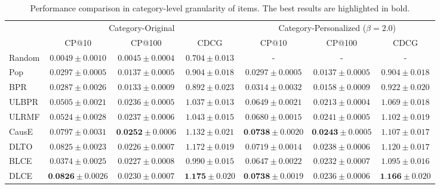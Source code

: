 \documentclass[manuscript,screen]{acmart}
\begin{document}
\begin{table}[htbp]
	\small
	\caption{Performance comparison in category-level granularity of items.
		The best results are highlighted in bold.
	}
	\label{tab:comparison_category}
	\centering
	\begin{tabular}{lcccccc}
		\toprule
		& \multicolumn{3}{c}{Category-Original} & \multicolumn{3}{c}{Category-Personalized ($\beta = 2.0$)}\\
		\cmidrule(lr){2-4} \cmidrule(lr){5-7} 
		& CP@10 & CP@100 & CDCG & CP@10 & CP@100 & CDCG \\
		\midrule
		Random & $0.0049 \pm 0.0010$ & $0.0045 \pm 0.0004$ & $0.704 \pm 0.013$ 
		&- & - & -  \\
		Pop & $0.0297 \pm 0.0005$ & $0.0137 \pm 0.0005$ & $0.904 \pm 0.018$ 
		& $0.0297 \pm 0.0005$ & $0.0137 \pm 0.0005$ & $0.904 \pm 0.018$  \\
		BPR & $0.0287 \pm 0.0026$ & $0.0133 \pm 0.0009$ & $0.892 \pm 0.023$ 
		&$0.0314 \pm 0.0032$ & $0.0158 \pm 0.0009$ & $0.922 \pm 0.020$   \\
		\midrule
		ULBPR & $0.0505 \pm 0.0021$ & $0.0236 \pm 0.0005$ & $1.037 \pm 0.013$ 
		&$0.0649 \pm 0.0021$ & $0.0213 \pm 0.0004$ & $1.069 \pm 0.018$  \\
		ULRMF & $0.0524 \pm 0.0028$ & $0.0237 \pm 0.0006$ & $1.043 \pm 0.015$ 
		&$0.0680 \pm 0.0015$ & $0.0241 \pm 0.0005$ & $1.102 \pm 0.019$  \\
		CausE & $0.0797 \pm 0.0031$ & $\textbf{0.0252} \pm 0.0006$ & $1.132 \pm 0.021$ 
		&$\textbf{0.0738} \pm 0.0020$ & $\textbf{0.0243} \pm 0.0005$ & $1.107 \pm 0.017$  \\
		DLTO &$0.0825 \pm 0.0023$ & $0.0226 \pm 0.0007$ & $1.172 \pm 0.019$ 
		&$0.0719 \pm 0.0014$ & $0.0238 \pm 0.0006$ & $1.120 \pm 0.017$  \\
		BLCE &$0.0374 \pm 0.0025$ & $0.0227 \pm 0.0008$ & $0.990 \pm 0.015$ 
		&$0.0647 \pm 0.0022$ & $0.0232 \pm 0.0007$ & $1.095 \pm 0.016$  \\
		DLCE &$\textbf{0.0826} \pm 0.0026$ & $0.0230 \pm 0.0007$ & $\textbf{1.175} \pm 0.020$ 
		&$\textbf{0.0738} \pm 0.0019$ & $0.0236 \pm 0.0006$ & $\textbf{1.166} \pm 0.020$  \\
		\bottomrule
	\end{tabular}
\end{table}
\end{document}

